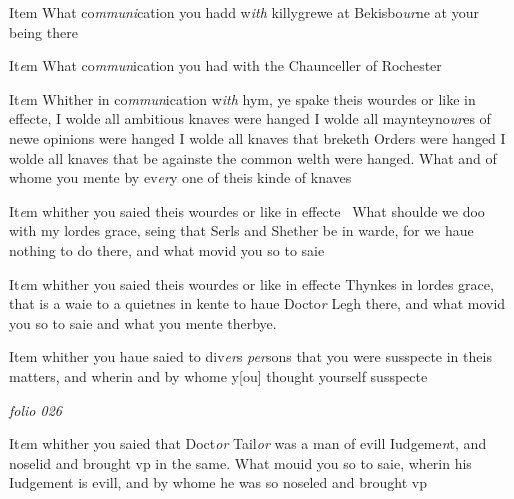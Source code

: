 \documentclass[12pt, a4paper]{book}
\begin{document}
		\ifthenelse{\isodd{\thepage}}
		{\reversemarginpar}
		{\normalmarginpar}
		Item What co\textit{mmuni}cation you hadd w\textit{ith} killygrewe at Bekisbo\textit{ur}ne
 at your being there
            		
		\ifthenelse{\isodd{\thepage}}
		{\reversemarginpar}
		{\normalmarginpar}
		It\textit{e}m What co\textit{mmun}ication you had with the Chaunceller of Rochester
            			
		\ifthenelse{\isodd{\thepage}}
		{\reversemarginpar}
		{\normalmarginpar}
		It\textit{e}m Whither in co\textit{mmun}ication w\textit{ith} hym, ye spake theis wourdes
 or like in effecte, I wolde all ambitious knaves were hanged
 I wolde all maynteyno\textit{ur}es of newe opinions were hanged
 I wolde all knaves that breketh Orders were hanged
 I wolde all knaves that be againste the common welth were
 hanged. What and of whome you mente by ev\textit{er}y one
            			of theis kinde of knaves
            		
		\ifthenelse{\isodd{\thepage}}
		{\reversemarginpar}
		{\normalmarginpar}
		It\textit{e}m whither you saied theis wourdes or like in effecte 
            			What shoulde we doo with my lordes grace, seing that
 Serls and Shether be in warde, for we haue nothing
 to do there, and what movid you so to saie
            		
		\ifthenelse{\isodd{\thepage}}
		{\reversemarginpar}
		{\normalmarginpar}
		It\textit{e}m whither you saied theis wourdes or like in effecte
            			Thynkes in lordes grace, that is a waie to a quietnes
            			in kente to haue Docto\textit{r} Legh there, and what movid
            			you so to saie and what you mente therbye.
            		
		\ifthenelse{\isodd{\thepage}}
		{\reversemarginpar}
		{\normalmarginpar}
		Item whither you haue saied to div\textit{er}s \textit{per}sons that you were
 susspecte in theis matters, and wherin and by whome y[ou]
 thought yourself susspecte
 

\dotfill
					

\textit{folio 026}


 	
				\marginpar[\vspace{0.5cm}{\textcolor{Gray}{n}}]{}
			
		\ifthenelse{\isodd{\thepage}}
		{\reversemarginpar}
		{\normalmarginpar}
		It\textit{e}m whither you saied that Doct\textit{or} Tail\textit{or} was a man of evill Iudgeme\textit{n}t, and noselid and brought vp in the same. What mouid you so to saie, wherin his Iudgement is evill, and by whome he was so noseled and brought vp 
 	
\end{document}
